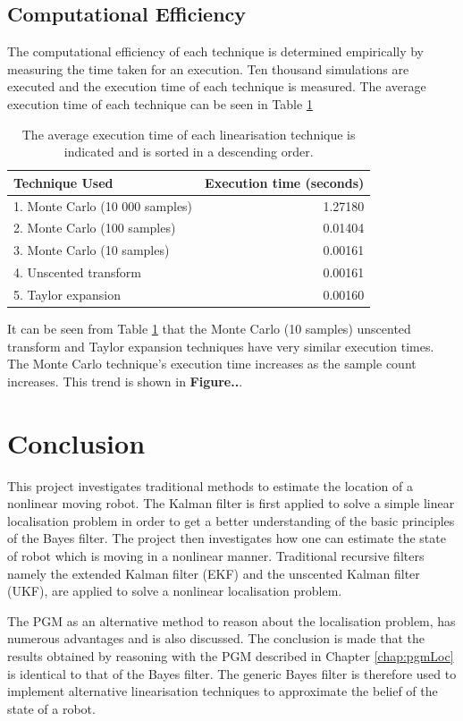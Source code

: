 \documentclass[12pt,oneside,openany,a4paper, %
afrikaans,english,
]{memoir}
\numberwithin{equation}{chapter}
\begin{document}
{\section{Computational Efficiency}
The computational efficiency of each technique is determined empirically by measuring the time taken for an execution. Ten thousand simulations are executed and the execution time of each technique is measured. The average execution time of each technique can be seen in Table \ref{table:extimes}
\begin{table}[!h]
\centering
\begin{tabular}{ |l|r| }
\hline
Technique Used & Execution time (seconds)\\
\hline
1.  Monte Carlo (10 000 samples) & 1.27180\\
2. Monte Carlo (100 samples) & 0.01404  \\ 
3. Monte Carlo (10 samples) & 0.00161\\
4. Unscented transform & 0.00161 \\ 
5. Taylor expansion & 0.00160 \\ 
\hline
\end{tabular}
\caption[Execution times]{The average execution time of each linearisation technique is indicated and is sorted in a descending order.}
\label{table:extimes}
\end{table}

It can be seen from Table \ref{table:extimes} that the Monte Carlo (10 samples) unscented transform and Taylor expansion techniques have very similar execution times. The Monte Carlo technique's execution time increases as the sample count increases. This trend is shown in \textbf{Figure..}.



\chapter{Conclusion}
This project investigates traditional methods to estimate the location of a nonlinear moving robot. The Kalman filter is first applied to solve a simple linear localisation problem in order to get a better understanding of the basic principles of the Bayes filter. The project then investigates how one can estimate the state of robot which is moving in a nonlinear manner. Traditional recursive filters namely the extended Kalman filter (EKF) and the unscented Kalman filter (UKF), are applied to solve a nonlinear localisation problem.

The PGM as an alternative method to reason about the localisation problem, has numerous advantages and is also discussed. The conclusion is made that the results obtained by reasoning with the PGM described in Chapter \ref{chap:pgmLoc} is identical to that of the Bayes filter. The generic Bayes filter is therefore used to implement alternative linearisation techniques to approximate the belief of the state of a robot.

}
\end{document}

